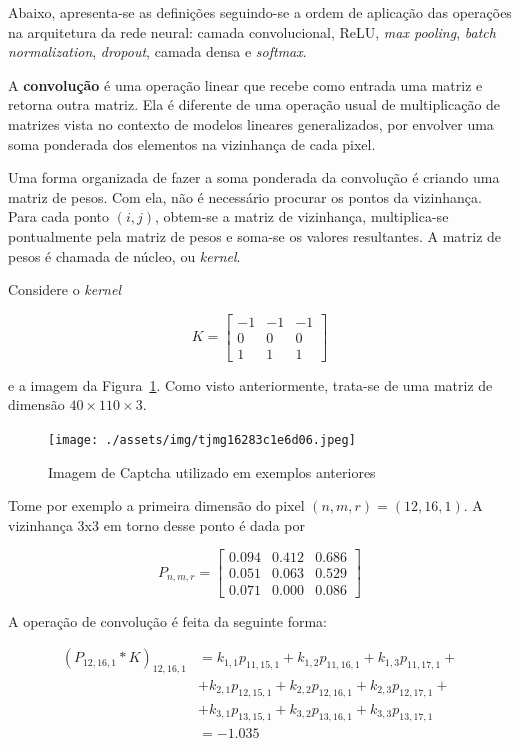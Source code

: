 \documentclass[12pt,twoside,brazilian]{book}
\begin{document}
Abaixo, apresenta-se as definições seguindo-se a ordem de aplicação das
operações na arquitetura da rede neural: camada convolucional, ReLU,
\emph{max pooling}, \emph{batch normalization}, \emph{dropout}, camada
densa e \emph{softmax}.

A \textbf{convolução} é uma operação linear que recebe como entrada uma
matriz e retorna outra matriz. Ela é diferente de uma operação usual de
multiplicação de matrizes vista no contexto de modelos lineares
generalizados, por envolver uma soma ponderada dos elementos na
vizinhança de cada pixel.

Uma forma organizada de fazer a soma ponderada da convolução é criando
uma matriz de pesos. Com ela, não é necessário procurar os pontos da
vizinhança. Para cada ponto \((i,j)\), obtem-se a matriz de vizinhança,
multiplica-se pontualmente pela matriz de pesos e soma-se os valores
resultantes. A matriz de pesos é chamada de núcleo, ou \emph{kernel}.

Considere o \emph{kernel}

\[
K = \left[\begin{array}{rrr}-1&-1&-1\\0&0&0\\1&1&1\end{array}\right]
\]

e a imagem da Figura~\ref{fig-tjmg-exemplo-conv}. Como visto
anteriormente, trata-se de uma matriz de dimensão
\(40\times110\times3\).

\begin{figure}

{\centering \texttt{[image: ./assets/img/tjmg16283c1e6d06.jpeg]}

}

\caption{\label{fig-tjmg-exemplo-conv}Imagem de Captcha utilizado em
exemplos anteriores}

\end{figure}

Tome por exemplo a primeira dimensão do pixel \((n,m,r) = (12,16,1)\). A
vizinhança 3x3 em torno desse ponto é dada por

\[
P_{n,m,r} = \left[\begin{array}{rrr}
0.094 & 0.412 & 0.686 \\ 
0.051 & 0.063 & 0.529 \\ 
0.071 & 0.000 & 0.086 
\end{array}\right]
\]

A operação de convolução é feita da seguinte forma:

\[
\begin{aligned}
(P_{12,16,1} *K )_{12,16,1}
&= k_{1,1}p_{11,15,1} + k_{1,2}p_{11,16,1} + k_{1,3}p_{11,17,1} + \\
&+ k_{2,1}p_{12,15,1} + k_{2,2}p_{12,16,1} + k_{2,3}p_{12,17,1} + \\
&+ k_{3,1}p_{13,15,1} + k_{3,2}p_{13,16,1} + k_{3,3}p_{13,17,1} \\
& = -1.035
\end{aligned}
\]
\end{document}
